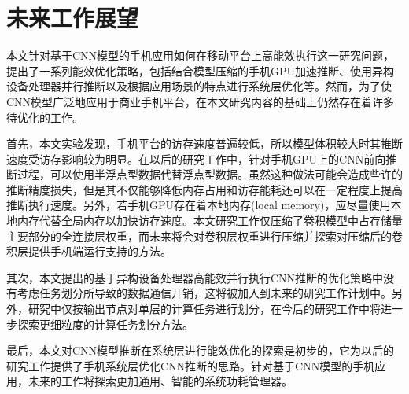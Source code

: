 \section{未来工作展望}
本文针对基于CNN模型的手机应用如何在移动平台上高能效执行这一研究问题，提出了一系列能效优化策略，包括结合模型压缩的手机GPU加速推断、使用异构设备处理器并行推断以及根据应用场景的特点进行系统层优化等。然而，为了使CNN模型广泛地应用于商业手机平台，在本文研究内容的基础上仍然存在着许多待优化的工作。

首先，本文实验发现，手机平台的访存速度普遍较低，所以模型体积较大时其推断速度受访存影响较为明显。在以后的研究工作中，针对手机GPU上的CNN前向推断过程，可以使用半浮点型数据代替浮点型数据。虽然这种做法可能会造成些许的推断精度损失，但是其不仅能够降低内存占用和访存能耗还可以在一定程度上提高推断执行速度。另外，若手机GPU存在着本地内存(local memory)，应尽量使用本地内存代替全局内存以加快访存速度。本文研究工作仅压缩了卷积模型中占存储量主要部分的全连接层权重，而未来将会对卷积层权重进行压缩并探索对压缩后的卷积层提供手机端运行支持的方法。

其次，本文提出的基于异构设备处理器高能效并行执行CNN推断的优化策略中没有考虑任务划分所导致的数据通信开销，这将被加入到未来的研究工作计划中。另外，研究中仅按输出节点对单层的计算任务进行划分，在今后的研究工作中将进一步探索更细粒度的计算任务划分方法。

最后，本文对CNN模型推断在系统层进行能效优化的探索是初步的，它为以后的研究工作提供了手机系统层优化CNN推断的思路。针对基于CNN模型的手机应用，未来的工作将探索更加通用、智能的系统功耗管理器。
\cleardoublepage 